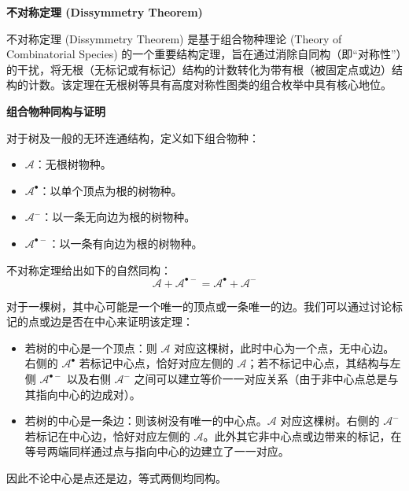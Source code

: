 \textbf{不对称定理 (Dissymmetry Theorem)}

不对称定理 (Dissymmetry Theorem) 是基于组合物种理论 (Theory of Combinatorial Species) 的一个重要结构定理，旨在通过消除自同构（即“对称性”）的干扰，将无根（无标记或有标记）结构的计数转化为带有根（被固定点或边）结构的计数。该定理在无根树等具有高度对称性图类的组合枚举中具有核心地位。

\textbf{组合物种同构与证明}

对于树及一般的无环连通结构，定义如下组合物种：
\begin{itemize}
    \item \(\mathcal{A}\)：无根树物种。
    \item \(\mathcal{A}^\bullet\)：以单个顶点为根的树物种。
    \item \(\mathcal{A}^{-}\)：以一条无向边为根的树物种。
    \item \(\mathcal{A}^{\bullet-}\)：以一条有向边为根的树物种。
\end{itemize}

不对称定理给出如下的自然同构：
\[
\mathcal{A} + \mathcal{A}^{\bullet-} = \mathcal{A}^\bullet + \mathcal{A}^{-}
\]

对于一棵树，其中心可能是一个唯一的顶点或一条唯一的边。我们可以通过讨论标记的点或边是否在中心来证明该定理：
\begin{itemize}
    \item 若树的中心是一个顶点：则 \(\mathcal{A}\) 对应这棵树，此时中心为一个点，无中心边。右侧的 \(\mathcal{A}^\bullet\) 若标记中心点，恰好对应左侧的 \(\mathcal{A}\)；若不标记中心点，其结构与左侧 \(\mathcal{A}^{\bullet-}\) 以及右侧 \(\mathcal{A}^{-}\) 之间可以建立等价一一对应关系（由于非中心点总是与其指向中心的边成对）。
    \item 若树的中心是一条边：则该树没有唯一的中心点。\(\mathcal{A}\) 对应这棵树。右侧的 \(\mathcal{A}^{-}\) 若标记在中心边，恰好对应左侧的 \(\mathcal{A}\)。此外其它非中心点或边带来的标记，在等号两端同样通过点与指向中心的边建立了一一对应。
\end{itemize}
因此不论中心是点还是边，等式两侧均同构。

